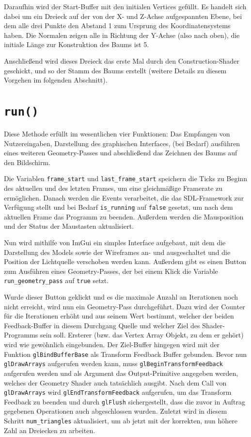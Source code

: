 Daraufhin wird der Start-Buffer mit den initialen Vertices gefüllt. Es handelt sich dabei um ein Dreieck auf der von der X- und Z-Achse aufgespannten Ebene, bei dem alle drei Punkte den Abstand 1 zum Ursprung des Koordinatensystems haben. Die Normalen zeigen alle in Richtung der Y-Achse (also nach oben), die initiale Länge zur Konstruktion des Baums ist 5.

Anschließend wird dieses Dreieck das erste Mal durch den Construction-Shader geschickt, und so der Stamm des Baums erstellt (weitere Details zu diesem Vorgehen im folgenden Abschnitt). 

\section{\lstinline{run()}}
Diese Methode erfüllt im wesentlichen vier Funktionen: Das Empfangen von Nutzereingaben, Darstellung des graphischen Interfaces, (bei Bedarf) ausführen eines weiteren Geometry-Passes und abschließend das Zeichnen des Baums auf den Bildschirm. 

Die Variablen \lstinline{frame_start} und \lstinline{last_frame_start} speichern die Ticks zu Beginn des aktuellen und des letzten Frames, um eine gleichmäßige Framerate zu ermöglichen. Danach werden die Events verarbeitet, die das SDL-Framework zur Verfügung stellt und bei Bedarf \lstinline{is_running} auf \lstinline{false} gesetzt, um nach dem aktuellen Frame das Programm zu beenden. Außerdem werden die Mausposition und der Status der Maustasten aktualisiert. 

Nun wird mithilfe von ImGui ein simples Interface aufgebaut, mit dem die Darstellung des Models sowie der Wireframes an- und ausgeschaltet und die Position der Lichtquelle verschoben werden kann. Außerdem gibt es einen Button zum Ausführen eines Geometry-Passes, der bei einem Klick die Variable \lstinline{run_geometry_pass} auf \lstinline{true} setzt.

Wurde dieser Button geklickt und es die maximale Anzahl an Iterationen noch nicht erreicht, wird nun ein Geometry-Pass durchgeführt. Dazu wird der Counter für die Iterationen erhöht und aus seinem Wert bestimmt, welcher der beiden Feedback-Buffer in diesem Durchgang Quelle und welcher Ziel des Shader-Programms sein soll. Ersterer (bzw. das Vertex Array Objekt, zu dem er gehört) wird wie gewöhnlich eingebunden. Der Ziel-Buffer hingegen wird mit der Funktion \lstinline{glBindBufferBase} als Transform Feedback Buffer gebunden. Bevor nun \lstinline{glDrawArrays} aufgerufen werden kann, muss \lstinline{glBeginTransformFeedback} aufgerufen werden und als Argument das Output-Primitive angegeben werden, welches der Geometry Shader auch tatsächlich ausgibt. Nach dem Call von \lstinline{glDrawArrays} wird \lstinline{glEndTransformFeedback} aufgerufen, um das Transform Feedback zu beenden und durch \lstinline{glFlush} sichergestellt, dass die zuvor in Auftrag gegebenen Operationen auch abgeschlossen wurden. Zuletzt wird in diesem Schritt \lstinline{num_triangles} aktualisiert, um ab jetzt mit der korrekten, nun höhere Zahl an Dreiecken zu arbeiten. 

